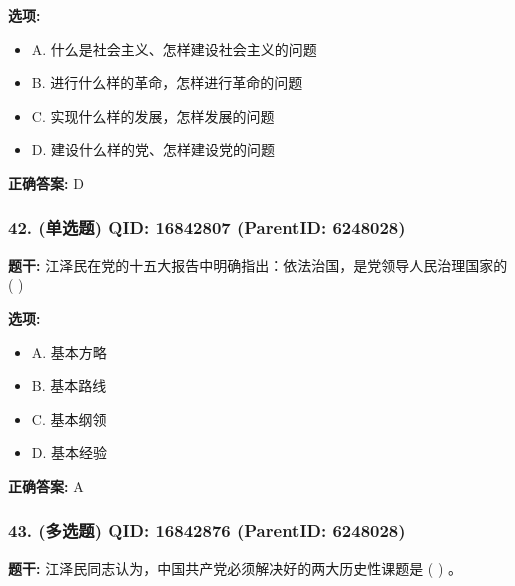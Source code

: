 \documentclass[12pt,UTF8]{ctexart}
\begin{document}
\textbf{选项:}
\begin{itemize}[leftmargin=*]

  \item A. 什么是社会主义、怎样建设社会主义的问题

  \item B. 进行什么样的革命，怎样进行革命的问题

  \item C. 实现什么样的发展，怎样发展的问题

  \item D. 建设什么样的党、怎样建设党的问题

\end{itemize}

\textbf{正确答案:}
D

\vspace{0.3em}\hrulefill\vspace{0.7em}

\subsubsection*{42. (单选题) \small QID: 16842807 (ParentID: 6248028)}

\textbf{题干:}
江泽民在党的十五大报告中明确指出：依法治国，是党领导人民治理国家的 ( )



\textbf{选项:}
\begin{itemize}[leftmargin=*]

  \item A. 基本方略

  \item B. 基本路线

  \item C. 基本纲领

  \item D. 基本经验

\end{itemize}

\textbf{正确答案:}
A

\vspace{0.3em}\hrulefill\vspace{0.7em}

\subsubsection*{43. (多选题) \small QID: 16842876 (ParentID: 6248028)}

\textbf{题干:}
江泽民同志认为，中国共产党必须解决好的两大历史性课题是 ( ) 。
\end{document}
